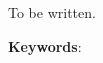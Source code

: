 \begin{resumo}
\renewcommand{\sfdefault}{\rmdefault}
    To be written.

    \noindent\textbf{Keywords}: 
    \vspace{\fill}
\end{resumo}

\renewcommand{\sfdefault}{\rmdefault}
\listoffigures*
\cleardoublepage


\renewcommand{\sfdefault}{\rmdefault}
\listoftables*
\cleardoublepage

\renewcommand{\sfdefault}{\rmdefault}
\printglossaries
\cleardoublepage


\renewcommand{\sfdefault}{\rmdefault}
\tableofcontents*
\cleardoublepage
